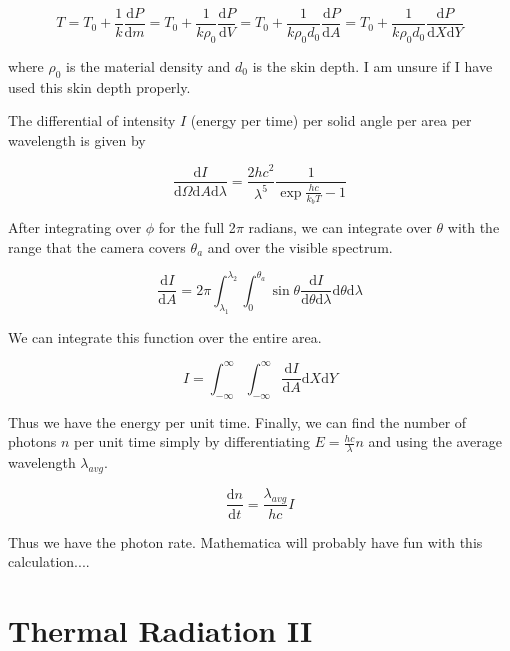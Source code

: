 \documentclass[12pt]{article}
\begin{document}
\begin{equation}
T=T_0+\frac{1}{k} \frac{\mathrm{d}P}{\mathrm{d}m}=T_0+\frac{1}{k \rho_0} \frac{\mathrm{d}P}{\mathrm{d}V}=T_0+\frac{1}{k \rho_0 d_0} \frac{\mathrm{d}P}{\mathrm{d}A}=T_0+\frac{1}{k \rho_0 d_0} \frac{\mathrm{d}P}{\mathrm{d}X \mathrm{d}Y}
\end{equation}

where $\rho_0$ is the material density and $d_0$ is the skin depth. I am unsure if I have used this skin depth properly.

The differential of intensity $I$ (energy per time) per solid angle per area per wavelength is given by

\begin{equation}
\frac{\mathrm{d}I}{\mathrm{d} \Omega \mathrm{d}A \mathrm{d} \lambda}=\frac{2hc^2}{\lambda^5} \frac{1}{\exp{\frac{hc}{k_b T}}-1}
\end{equation}

After integrating over $\phi$ for the full 2$\pi$ radians, we can integrate over $\theta$ with the range that the camera covers $\theta_a$ and over the visible spectrum.

\begin{equation}
\frac{\mathrm{d}I}{\mathrm{d}A}=2 \pi \int_{\lambda_1}^{\lambda_2} \int_0^{\theta_a} \sin \theta \frac{\mathrm{d}I}{\mathrm{d} \theta \mathrm{d} \lambda} \mathrm{d} \theta \mathrm{d} \lambda
\end{equation}

We can integrate this function over the entire area.

\begin{equation}
I=\int_{-\infty}^{\infty} \int_{-\infty}^{\infty} \frac{\mathrm{d}I}{\mathrm{d}A} \mathrm{d}X \mathrm{d}Y
\end{equation}

Thus we have the energy per unit time. Finally, we can find the number of photons $n$ per unit time simply by differentiating $E=\frac{hc}{\lambda} n$ and using the average wavelength $\lambda_{avg}$.

\begin{equation}
\frac{\mathrm{d}n}{\mathrm{d}t}=\frac{\lambda_{avg}}{hc} I
\end{equation}

Thus we have the photon rate. Mathematica will probably have fun with this calculation....

\section{Thermal Radiation II}
\end{document}
